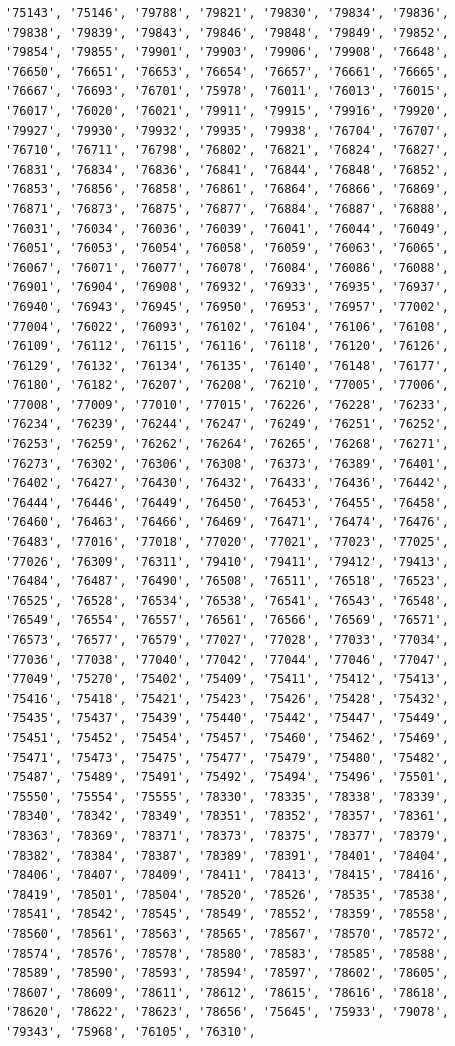 \documentclass[
  letterpaper,
  DIV=11,
  numbers=noendperiod]{scrartcl}
\begin{document}
\begin{verbatim}
'75143', '75146', '79788', '79821', '79830', '79834', '79836', '79838', '79839', '79843', '79846', '79848', '79849', '79852', '79854', '79855', '79901', '79903', '79906', '79908', '76648', '76650', '76651', '76653', '76654', '76657', '76661', '76665', '76667', '76693', '76701', '75978', '76011', '76013', '76015', '76017', '76020', '76021', '79911', '79915', '79916', '79920', '79927', '79930', '79932', '79935', '79938', '76704', '76707', '76710', '76711', '76798', '76802', '76821', '76824', '76827', '76831', '76834', '76836', '76841', '76844', '76848', '76852', '76853', '76856', '76858', '76861', '76864', '76866', '76869', '76871', '76873', '76875', '76877', '76884', '76887', '76888', '76031', '76034', '76036', '76039', '76041', '76044', '76049', '76051', '76053', '76054', '76058', '76059', '76063', '76065', '76067', '76071', '76077', '76078', '76084', '76086', '76088', '76901', '76904', '76908', '76932', '76933', '76935', '76937', '76940', '76943', '76945', '76950', '76953', '76957', '77002', '77004', '76022', '76093', '76102', '76104', '76106', '76108', '76109', '76112', '76115', '76116', '76118', '76120', '76126', '76129', '76132', '76134', '76135', '76140', '76148', '76177', '76180', '76182', '76207', '76208', '76210', '77005', '77006', '77008', '77009', '77010', '77015', '76226', '76228', '76233', '76234', '76239', '76244', '76247', '76249', '76251', '76252', '76253', '76259', '76262', '76264', '76265', '76268', '76271', '76273', '76302', '76306', '76308', '76373', '76389', '76401', '76402', '76427', '76430', '76432', '76433', '76436', '76442', '76444', '76446', '76449', '76450', '76453', '76455', '76458', '76460', '76463', '76466', '76469', '76471', '76474', '76476', '76483', '77016', '77018', '77020', '77021', '77023', '77025', '77026', '76309', '76311', '79410', '79411', '79412', '79413', '76484', '76487', '76490', '76508', '76511', '76518', '76523', '76525', '76528', '76534', '76538', '76541', '76543', '76548', '76549', '76554', '76557', '76561', '76566', '76569', '76571', '76573', '76577', '76579', '77027', '77028', '77033', '77034', '77036', '77038', '77040', '77042', '77044', '77046', '77047', '77049', '75270', '75402', '75409', '75411', '75412', '75413', '75416', '75418', '75421', '75423', '75426', '75428', '75432', '75435', '75437', '75439', '75440', '75442', '75447', '75449', '75451', '75452', '75454', '75457', '75460', '75462', '75469', '75471', '75473', '75475', '75477', '75479', '75480', '75482', '75487', '75489', '75491', '75492', '75494', '75496', '75501', '75550', '75554', '75555', '78330', '78335', '78338', '78339', '78340', '78342', '78349', '78351', '78352', '78357', '78361', '78363', '78369', '78371', '78373', '78375', '78377', '78379', '78382', '78384', '78387', '78389', '78391', '78401', '78404', '78406', '78407', '78409', '78411', '78413', '78415', '78416', '78419', '78501', '78504', '78520', '78526', '78535', '78538', '78541', '78542', '78545', '78549', '78552', '78359', '78558', '78560', '78561', '78563', '78565', '78567', '78570', '78572', '78574', '78576', '78578', '78580', '78583', '78585', '78588', '78589', '78590', '78593', '78594', '78597', '78602', '78605', '78607', '78609', '78611', '78612', '78615', '78616', '78618', '78620', '78622', '78623', '78656', '75645', '75933', '79078', '79343', '75968', '76105', '76310', 
\end{verbatim}
\end{document}
